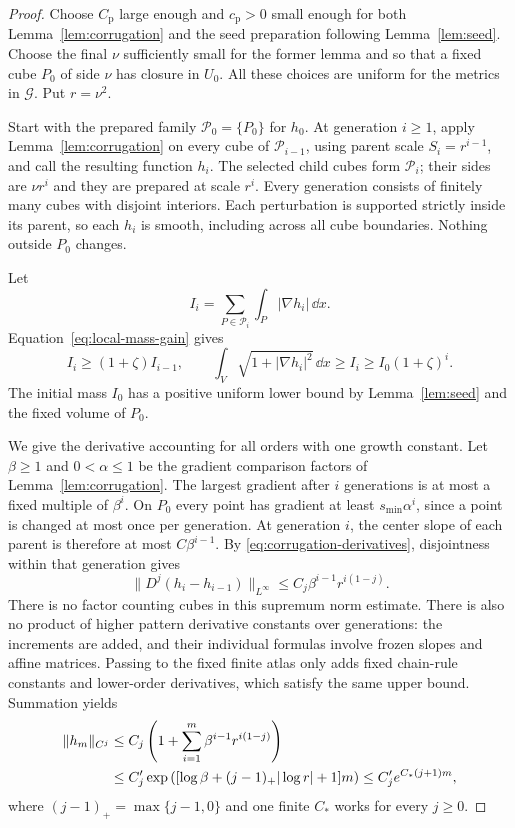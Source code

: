 \begin{proof}
Choose $C_{\mathrm p}$ large enough and $c_{\mathrm p}>0$ small
enough for both Lemma~\ref{lem:corrugation} and the seed preparation
following Lemma~\ref{lem:seed}.  Choose the final $\nu$ sufficiently
small for the former lemma and so that a fixed cube $P_0$ of side
$\nu$ has closure in $U_0$.  All these choices are uniform for the
metrics in $\mathcal G$.  Put $r=\nu^2$.

Start with the prepared family $\mathcal P_0=\{P_0\}$ for $h_0$.
At generation $i\ge1$, apply Lemma~\ref{lem:corrugation} on every
cube of $\mathcal P_{i-1}$, using parent scale $S_i=r^{i-1}$,
and call the resulting function $h_i$.  The selected child cubes
form $\mathcal P_i$; their sides are $\nu r^i$ and they are
prepared at scale $r^i$.  Every generation consists of finitely
many cubes with disjoint interiors.  Each perturbation is supported
strictly inside its parent, so each $h_i$ is smooth, including across
all cube boundaries.  Nothing outside $P_0$ changes.

Let
\[
 I_i=\sum_{P\in\mathcal P_i}\int_P|\nabla h_i|\,\dd x.
\]
Equation~\eqref{eq:local-mass-gain} gives
\begin{equation}\label{eq:iterated-mass}
 I_i\ge(1+\zeta)I_{i-1},\qquad
 \int_V\sqrt{1+|\nabla h_i|^2}\,\dd x
 \ge I_i\ge I_0(1+\zeta)^i.
\end{equation}
The initial mass $I_0$ has a positive uniform lower bound by
Lemma~\ref{lem:seed} and the fixed volume of $P_0$.

We give the derivative accounting for all orders with one growth
constant.  Let $\beta\ge1$ and $0<\alpha\le1$ be the gradient
comparison factors of Lemma~\ref{lem:corrugation}.  The largest
gradient after $i$ generations is at most a fixed multiple of
$\beta^i$.  On $P_0$ every point has gradient at least
$s_{\min}\alpha^i$, since a point is changed at most once per generation.
At generation $i$, the center slope of each parent is therefore
at most $C\beta^{i-1}$.  By
\eqref{eq:corrugation-derivatives}, disjointness within that
generation gives
\begin{equation}\label{eq:generation-derivatives}
 \|D^j(h_i-h_{i-1})\|_{L^\infty}
 \le C_j\beta^{i-1}r^{i(1-j)}.
\end{equation}
There is no factor counting cubes in this supremum norm estimate.
There is also no product of higher pattern derivative constants
over generations: the increments are added, and their individual
formulas involve frozen slopes and affine matrices.  Passing to
the fixed finite atlas only adds fixed chain-rule constants and
lower-order derivatives, which satisfy the same upper bound.
Summation yields
\begin{align}
 \|h_m\|_{C^j}
 &\le C_j\left(1+\sum_{i=1}^m
                  \beta^{i-1}r^{i(1-j)}\right)\notag\\
 &\le C'_j\exp\left(
   [\log\beta+(j-1)_+|\log r|+1]m\right)
 \le C'_j e^{C_*(j+1)m},
 \label{eq:all-order-envelope-growth}
\end{align}
where $(j-1)_+=\max\{j-1,0\}$ and one finite $C_*$ works for
every $j\ge0$.


\end{proof}
